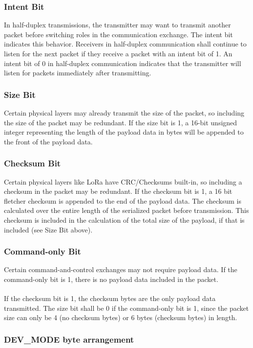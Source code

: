 \documentclass{article}
\begin{document}
    \subsubsection{Intent Bit}
    In half-duplex transmissions, the transmitter may want to transmit another packet before switching roles in the communication exchange. The intent bit indicates this behavior. Receivers in half-duplex communication shall continue to listen for the next packet if they receive a packet with an intent bit of 1. An intent bit of 0 in half-duplex communication indicates that the transmitter will listen for packets immediately after transmitting.

    \subsubsection{Size Bit}
    Certain physical layers may already transmit the size of the packet, so including the size of the packet may be redundant. If the size bit is 1, a 16-bit unsigned integer representing the length of the payload data in bytes will be appended to the front of the payload data.

    \subsubsection{Checksum Bit}
    Certain physical layers like LoRa have CRC/Checksums built-in, so including a checksum in the packet may be redundant. If the checksum bit is 1, a 16 bit fletcher checksum is appended to the end of the payload data. The checksum is calculated over the entire length of the serialized packet before transmission. This checksum is included in the calculation of the total size of the payload, if that is included (see Size Bit above).
    
    \subsubsection{Command-only Bit}
    Certain command-and-control exchanges may not require payload data. If the command-only bit is 1, there is no payload data included in the packet.\\
    \\
    If the checksum bit is 1, the checksum bytes are the only payload data transmitted. The size bit shall be 0 if the command-only bit is 1, since the packet size can only be 4 (no checksum bytes) or 6 bytes (checksum bytes) in length.
    
    \subsubsection{DEV\_MODE byte arrangement}
\end{document}
